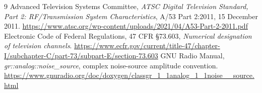 \documentclass[10pt,letterpaper]{article}
\begin{document}
\begin{thebibliography}{9}
 Advanced Television Systems Committee, \emph{ATSC Digital Television Standard, Part 2: RF/Transmission System Characteristics}, A/53 Part 2:2011, 15 December 2011. \url{https://www.atsc.org/wp-content/uploads/2021/04/A53-Part-2-2011.pdf}
 Electronic Code of Federal Regulations, 47 CFR \S 73.603, \emph{Numerical designation of television channels}. \url{https://www.ecfr.gov/current/title-47/chapter-I/subchapter-C/part-73/subpart-E/section-73.603}
 GNU Radio Manual, \emph{gr::analog::noise\_source}, complex noise-source amplitude convention. \url{https://www.gnuradio.org/doc/doxygen/classgr_1_1analog_1_1noise__source.html}
\end{thebibliography}
\end{document}
